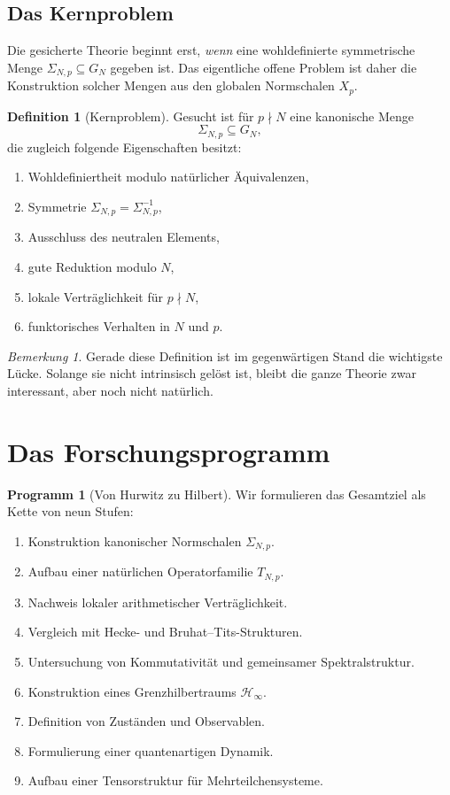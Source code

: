 \documentclass[12pt,a4paper]{article}
\theoremstyle{plain}
\theoremstyle{definition}
\newtheorem{definition}[satz]{Definition}
\newtheorem{programm}[satz]{Programm}
\theoremstyle{remark}
\newtheorem{bemerkung}[satz]{Bemerkung}
\newcommand{\Hinf}{\mathcal H_\infty}
\begin{document}
	\subsection{Das Kernproblem}
	
	Die gesicherte Theorie beginnt erst, \emph{wenn} eine wohldefinierte symmetrische Menge
	\(\Sigma_{N,p}\subseteq G_N\) gegeben ist. Das eigentliche offene Problem ist daher die
	Konstruktion solcher Mengen aus den globalen Normschalen \(X_p\).
	
	\begin{definition}[Kernproblem]
		Gesucht ist für \(p\nmid N\) eine kanonische Menge
		\[
		\Sigma_{N,p}\subseteq G_N,
		\]
		die zugleich folgende Eigenschaften besitzt:
		\begin{enumerate}
			\item Wohldefiniertheit modulo natürlicher Äquivalenzen,
			\item Symmetrie \(\Sigma_{N,p}=\Sigma_{N,p}^{-1}\),
			\item Ausschluss des neutralen Elements,
			\item gute Reduktion modulo \(N\),
			\item lokale Verträglichkeit für \(p\nmid N\),
			\item funktorisches Verhalten in \(N\) und \(p\).
		\end{enumerate}
	\end{definition}
	
	\begin{bemerkung}
		Gerade diese Definition ist im gegenwärtigen Stand die wichtigste Lücke. Solange sie nicht
		intrinsisch gelöst ist, bleibt die ganze Theorie zwar interessant, aber noch nicht natürlich.
	\end{bemerkung}
	
	\section{Das Forschungsprogramm}
	
	\begin{programm}[Von Hurwitz zu Hilbert]
		Wir formulieren das Gesamtziel als Kette von neun Stufen:
		\begin{enumerate}
			\item Konstruktion kanonischer Normschalen \(\Sigma_{N,p}\).
			\item Aufbau einer natürlichen Operatorfamilie \(T_{N,p}\).
			\item Nachweis lokaler arithmetischer Verträglichkeit.
			\item Vergleich mit Hecke- und Bruhat--Tits-Strukturen.
			\item Untersuchung von Kommutativität und gemeinsamer Spektralstruktur.
			\item Konstruktion eines Grenzhilbertraums \(\Hinf\).
			\item Definition von Zuständen und Observablen.
			\item Formulierung einer quantenartigen Dynamik.
			\item Aufbau einer Tensorstruktur für Mehrteilchensysteme.
		\end{enumerate}
	\end{programm}
	
\end{document}
